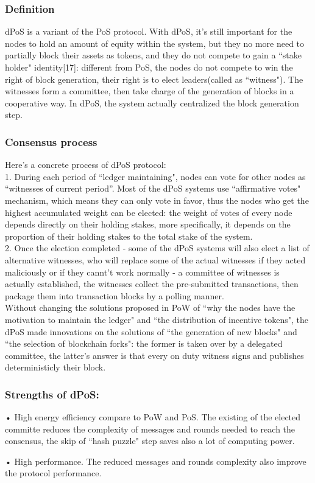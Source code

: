 \documentclass[doublespacing]{bmcart}
\begin{document}
\begin{CJK*}{UTF8}{gbsn}
\subsubsection*{Definition}	
dPoS is a variant of the PoS protocol. With dPoS, it's still important for the nodes to hold an amount of equity within the system, but they no more need to partially block their assets as tokens, and they do not compete to gain a ``stake holder" identity[17]: different from PoS, the nodes do not compete to win the right of block generation, their right is to elect leaders(called as ``witness"). The witnesses form a committee, then take charge of the generation of blocks in a cooperative way. In dPoS, the system actually centralized the block generation step.
 \subsubsection*{Consensus process}
Here's a concrete process of dPoS protocol:
\\1. During each period of ``ledger maintaining", nodes can vote for other nodes as “witnesses of current period”. Most of the dPoS systems use ``affirmative votes" mechanism, which means they can only vote in favor, thus the nodes who get the highest accumulated weight can be elected: the weight of votes of every node depends directly on their holding stakes, more specifically, it depends on the proportion of their holding stakes to the total stake of the system.
\\2. Once the election completed - some of the dPoS systems will also elect a list of alternative witnesses, who will replace some of the actual witnesses if they acted maliciously or if they cannt't work normally - a committee of witnesses is actually established, the witnesses collect the pre-submitted transactions, then package them into transaction blocks by a polling manner.
\\Without changing the solutions proposed in PoW of ``why the nodes have the motivation to maintain the ledger" and ``the distribution of incentive tokens", the dPoS made innovations on the solutions of ``the generation of new blocks" and ``the selection of blockchain forks": the former is taken over by a delegated committee, the latter's answer is that every on duty witness signs and publishes deterministicly their block.
\subsubsection*{Strengths of dPoS:}	
• High energy efficiency compare to PoW and PoS. The existing of the elected committe reduces the complexity of messages and rounds needed to reach the consensus, the skip of ``hash puzzle" step saves also a lot of computing power.
\par • High performance. The reduced messages and rounds complexity also improve the protocol performance. 

\end{CJK*}
\end{document}
